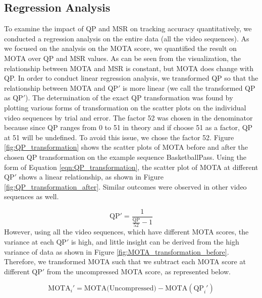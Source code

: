 \subsection{Regression Analysis}
\label{subsec:/results/section_a/regression_analysis}
To examine the impact of QP and MSR on tracking accuracy quantitatively, we conducted a regression analysis on the entire data (all the video sequences). As we focused on the analysis on the MOTA score, we quantified the result on MOTA over QP and MSR values. As can be seen from the visualization, the relationship between MOTA and MSR is constant, but MOTA does change with QP. In order to conduct linear regression analysis, we transformed QP so that the relationship between MOTA and $\text{QP}'$ is more linear (we call the transformed QP as $\text{QP}'$). The determination of the exact QP transformation was found by plotting various forms of transformation on the scatter plots on the individual video sequences by trial and error. The factor 52 was chosen in the denominator because since QP ranges from 0 to 51 in theory \cite{sullivan_overview_2012} and if choose 51 as a factor, QP at 51 will be undefined. To avoid this issue, we chose the factor 52. Figure \ref{fig:QP_transformation} shows the scatter plots of MOTA before and after the chosen QP transformation on the example sequence BasketballPass. Using the form of Equation \eqref{eqn:QP_transformation}, the scatter plot of MOTA at different $\text{QP}'$ shows a linear relationship, as shown in Figure \ref{fig:QP_transformation_after}. Similar outcomes were observed in other video sequences as well.

\begin{equation}
\text{QP}' =  \frac{1}{\frac{\text{QP}}{52}-1}
\label{eqn:QP_transformation}
\end{equation}
However, using all the video sequences, which have different MOTA scores, the variance at each $\text{QP}'$ is high, and little insight can be derived from the high variance of data as shown in Figure \ref{fig:MOTA_transformation_before}. Therefore, we transformed MOTA such that we subtract each MOTA score at different $\text{QP}'$ from the uncompressed MOTA score, as represented below.

\begin{equation}
\text{MOTA}_i' = \text{MOTA(Uncompressed)} -  \text{MOTA}(\text{QP}_i')
\label{eqn:MOTA_transformation}
\end{equation}
